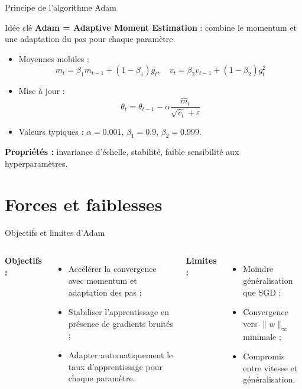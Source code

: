 \documentclass{beamer}
\begin{document}
\begin{frame}{Principe de l’algorithme Adam}

\begin{block}{Idée clé}
\textbf{Adam = Adaptive Moment Estimation} :
combine le \textcolor{mygreen}{momentum} et une adaptation du pas pour chaque paramètre.
\end{block}

\bigskip

\begin{itemize}
  \item Moyennes mobiles :
    \[
      m_t = \beta_1 m_{t-1} + (1 - \beta_1) g_t, \quad
      v_t = \beta_2 v_{t-1} + (1 - \beta_2) g_t^2
    \]
  \item Mise à jour :
    \[
      \theta_t = \theta_{t-1} - \alpha \frac{\hat{m}_t}{\sqrt{\hat{v}_t} + \varepsilon}
    \]
  \item Valeurs typiques : $\alpha{=}0.001$, $\beta_1{=}0.9$, $\beta_2{=}0.999$.
\end{itemize}

\bigskip

\textbf{Propriétés :}
invariance d’échelle, stabilité, faible sensibilité aux hyperparamètres.

\end{frame}


\section{Forces et faiblesses}

\begin{frame}{Objectifs et limites d’Adam}

\begin{columns}[T]
\textbf{Objectifs :}
\begin{itemize}
  \item Accélérer la convergence avec momentum et adaptation des pas ;
  \item Stabiliser l’apprentissage en présence de gradients bruités ;
  \item Adapter automatiquement le taux d’apprentissage pour chaque paramètre.
\end{itemize}

\textbf{Limites :}
\begin{itemize}
  \item Moindre généralisation que SGD \cite{wilson2017} ;
  \item Convergence vers $\|w\|_\infty$ minimale ;
  \item Compromis entre vitesse et généralisation.
\end{itemize}
\end{columns}

\end{frame}
\end{document}
